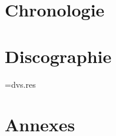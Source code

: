 \documentclass[noframe,hang]{dvs}
\begin{document}
\frontmatter*

\titleDVS


\printindex[ndxworks][\windexprologue]

\mainmatter*

\part{Chronologie}




\printindex[ndxperfs][\pindexprologue]

\part{Discographie}

\newwrite\Outline
\openout\Outline=dvs.res

























\closeout\Outline


\printindex[ndxdiscs][\dindexprologue]

\part{Annexes}

\appendix




\backmatter


\printindex[ndxauths][\aindexprologue]
\printindex[ndxnames][\nindexprologue]

\tableofcontents*

\end{document}
